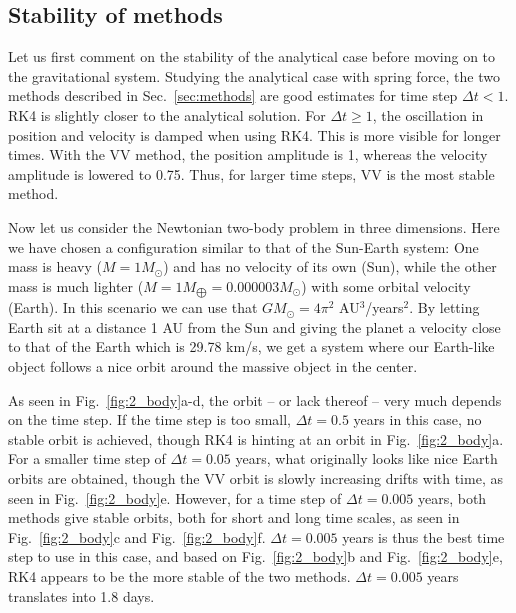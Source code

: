\documentclass{article}
\begin{document}
\begin{multicols}{2}
\subsection{Stability of methods}

Let us first comment on the stability of the analytical case before moving on to the gravitational system. Studying the analytical case with spring force, the two methods described in Sec.~\ref{sec:methods} are good estimates for time step $\Delta t<1$. RK4 is slightly closer to the analytical solution. For $\Delta t \geqslant 1$, the oscillation in position and velocity is damped when using RK4. This is more visible for longer times. With the VV method, the position amplitude is 1, whereas the velocity amplitude is lowered to 0.75. Thus, for larger time steps, VV is the most stable method.

Now let us consider the Newtonian two-body problem in three dimensions. Here we have chosen a configuration similar to that of the Sun-Earth system: One mass is heavy ($M = 1 M_{\odot}$) and has no velocity of its own (Sun), while the other mass is much lighter ($M = 1 M_{\bigoplus} = 0.000003 M_{\odot}$) with some orbital velocity (Earth). In this scenario we can use that $GM_{\odot} = 4\pi^2$ AU$^3$/years$^2$. By letting Earth sit at a distance 1 AU from the Sun and giving the planet a velocity close to that of the Earth which is 29.78 km/s, we get a system where our Earth-like object follows a nice orbit around the massive object in the center. 

As seen in Fig.~\ref{fig:2_body}a-d, the orbit -- or lack thereof -- very much depends on the time step. If the time step is too small, $\Delta t = 0.5$ years in this case, no stable orbit is achieved, though RK4 is hinting at an orbit in Fig.~\ref{fig:2_body}a. For a smaller time step of $\Delta t = 0.05$ years, what originally looks like nice Earth orbits are obtained, though the VV orbit is slowly increasing drifts with time, as seen in Fig.~\ref{fig:2_body}e. However, for a time step of $\Delta t = 0.005$ years, both methods give stable orbits, both for short and long time scales, as seen in Fig.~\ref{fig:2_body}c and Fig.~\ref{fig:2_body}f. $\Delta t = 0.005$ years is thus the best time step to use in this case, and based on Fig.~\ref{fig:2_body}b and Fig.~\ref{fig:2_body}e, RK4 appears to be the more stable of the two methods. $\Delta t = 0.005$ years translates into 1.8 days.


\end{multicols}
\end{document}
